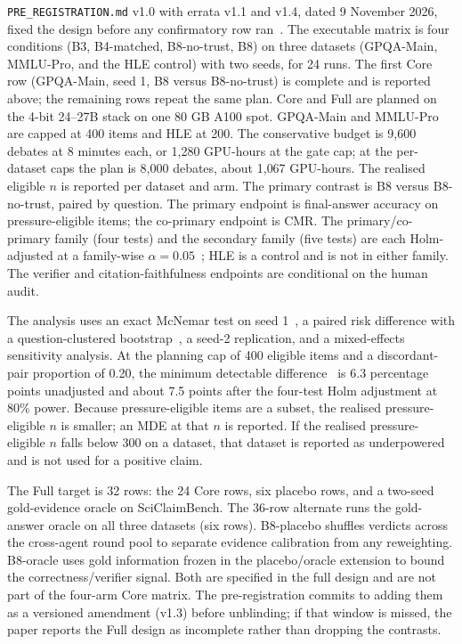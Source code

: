 \documentclass[a4paper,fleqn]{cas-sc}
\begin{document}
\texttt{PRE\_REGISTRATION.md} v1.0 with errata v1.1 and v1.4, dated 9 November 2026, fixed the design before any confirmatory row ran~\cite{nosek2018preregistration}. The executable matrix is four conditions (B3, B4-matched, B8-no-trust, B8) on three datasets (GPQA-Main, MMLU-Pro, and the HLE control) with two seeds, for 24 runs. The first Core row (GPQA-Main, seed 1, B8 versus B8-no-trust) is complete and is reported above; the remaining rows repeat the same plan. Core and Full are planned on the 4-bit 24--27B stack on one 80 GB A100 spot. GPQA-Main and MMLU-Pro are capped at 400 items and HLE at 200. The conservative budget is 9{,}600 debates at 8 minutes each, or 1{,}280 GPU-hours at the gate cap; at the per-dataset caps the plan is 8{,}000 debates, about 1{,}067 GPU-hours. The realised eligible $n$ is reported per dataset and arm. The primary contrast is B8 versus B8-no-trust, paired by question. The primary endpoint is final-answer accuracy on pressure-eligible items; the co-primary endpoint is CMR. The primary/co-primary family (four tests) and the secondary family (five tests) are each Holm-adjusted at a family-wise $\alpha = 0.05$~\cite{holm1979simple}; HLE is a control and is not in either family. The verifier and citation-faithfulness endpoints are conditional on the human audit.

The analysis uses an exact McNemar test on seed 1~\cite{mcnemar1947note}, a paired risk difference with a question-clustered bootstrap~\cite{efron1993introduction,koehn2004statistical}, a seed-2 replication, and a mixed-effects sensitivity analysis. At the planning cap of 400 eligible items and a discordant-pair proportion of 0.20, the minimum detectable difference~\cite{card2020little} is 6.3 percentage points unadjusted and about 7.5 points after the four-test Holm adjustment at 80\% power. Because pressure-eligible items are a subset, the realised pressure-eligible $n$ is smaller; an MDE at that $n$ is reported. If the realised pressure-eligible $n$ falls below 300 on a dataset, that dataset is reported as underpowered and is not used for a positive claim.

The Full target is 32 rows: the 24 Core rows, six placebo rows, and a two-seed gold-evidence oracle on SciClaimBench. The 36-row alternate runs the gold-answer oracle on all three datasets (six rows). B8-placebo shuffles verdicts across the cross-agent round pool to separate evidence calibration from any reweighting. B8-oracle uses gold information frozen in the placebo/oracle extension to bound the correctness/verifier signal. Both are specified in the full design and are not part of the four-arm Core matrix. The pre-registration commits to adding them as a versioned amendment (v1.3) before unblinding; if that window is missed, the paper reports the Full design as incomplete rather than dropping the contrasts.
\end{document}
